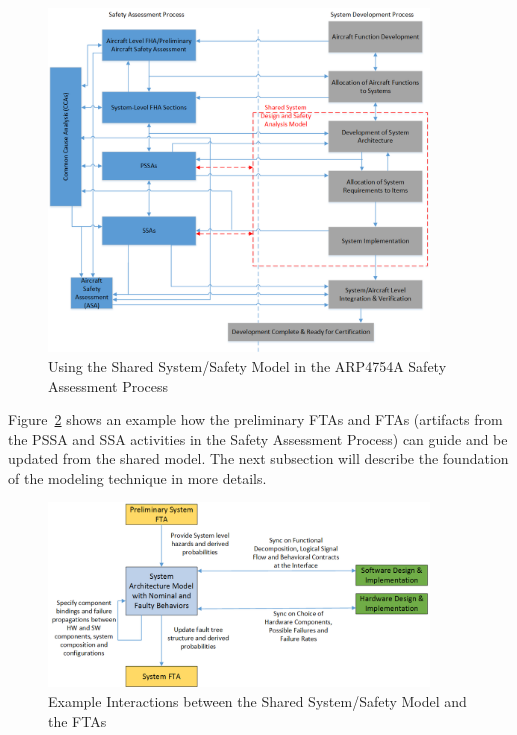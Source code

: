 \begin{figure}[h!]
	\vspace{-0.19in}
	\begin{center}
		\includegraphics[trim=0 9 0 5,clip,width=0.9\textwidth]{images/Safety_Assessment_Process_update.png}
	\end{center}
	\caption{Using the Shared System/Safety Model in the ARP4754A Safety Assessment Process}
	\label{fig:proposed_safety_process}
\end{figure}

Figure~\ref{fig:interaction_with_FTA} shows an example how the preliminary FTAs and FTAs (artifacts from the PSSA and SSA activities in the Safety Assessment Process) can guide and be updated from the shared model. The next subsection will describe the foundation of the modeling technique in more details.

\begin{figure}[h!]
	\vspace{-0.19in}
	\begin{center}
		\includegraphics[width=0.9\textwidth]{images/FTA_MBD_Workflow.png}
	\end{center}
	\caption{Example Interactions between the Shared System/Safety Model and  the FTAs}
	\label{fig:interaction_with_FTA}
\end{figure}

